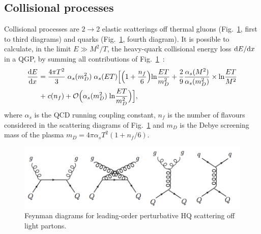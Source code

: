 \subsection{Collisional processes}
\label{sec:coll}
Collisional processes are $2 \rightarrow 2$ elastic scatterings off thermal 
gluons (Fig.~\ref{fig:LoopCollScatt}, first to third diagrams) and quarks 
(Fig.~\ref{fig:LoopCollScatt}, fourth diagram). It is possible to calculate,
 in the limit $E \gg M^2/T$, the heavy-quark collisional energy loss 
 ${\rm d} E/{\rm d} x$ in a QGP, by summing all contributions of 
 Fig.~\ref{fig:LoopCollScatt}~\cite{Peigne:2008nd}:
\begin{equation}
\label{eq:QCDenLossColl}
\begin{split}
\frac{{\rm d} E}{{\rm d} x} = \; & \frac{4 \pi T^2}{3}\;  \alpha_s (m^2_D)\;  \alpha_s(ET) {\Big [} {\Big (}  1 + \frac{n_f}{6}{\Big )} {\rm ln} \frac{ET}{m^2_D} + \frac{2}{9} \frac{\alpha_s(M^2)}{\alpha_s(m^2_D)} \times {\rm ln} \frac{ET}{M^2}  \\+\;  &c(n_f) + \mathcal{O}{\Big (}\alpha_s (m^2_D) \; {\rm ln}\frac{ET}{m^2_D}{\Big )}{\Big ]},
\end{split}
\end{equation}
where $\alpha_s$ is the QCD running coupling constant, $n_f$ is the number of flavours 
considered in the scattering diagrams of Fig.~\ref{fig:LoopCollScatt} and $m_D$ is the 
Debye screening mass of the plasma $m_D = 4\pi \alpha_s T^2 (1 + n_f/6)$. 
\begin{figure}[!ht]
  \centering
  \includegraphics[width=14cm]{FigCap2/LO_HQscattering.png}
  \caption{Feynman diagrams for leading-order perturbative HQ scattering off light partons.}
  \label{fig:LoopCollScatt}
\end{figure}

